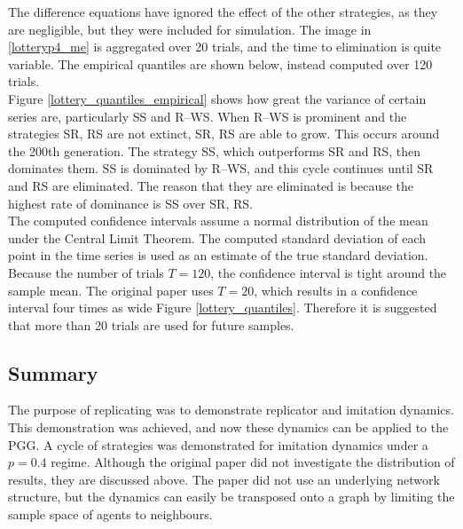 The difference equations have ignored the effect of the other strategies, as they are negligible, but they were included for simulation. The image in \ref{lotteryp4_me} is aggregated over 20 trials, and the time to elimination is quite variable. The empirical quantiles are shown below, instead computed over 120 trials.  \\

\FloatBarrier
{}
\FloatBarrier
Figure \ref{lottery_quantiles_empirical} shows how great the variance of certain series are, particularly SS and R--WS. When R--WS is prominent and the strategies SR, RS are not extinct, SR, RS are able to grow. This occurs around the 200th generation. The strategy SS, which outperforms SR and RS, then dominates them. SS is dominated by R--WS, and this cycle continues until SR and RS are eliminated. The reason that they are eliminated is because the highest rate of dominance is SS over SR, RS. \\
\FloatBarrier
{}
\FloatBarrier
 The computed confidence intervals assume a normal distribution of the mean under the Central Limit Theorem. The computed standard deviation of each point in the time series is used as an estimate of the true standard deviation. Because the number of trials $T=120$, the confidence interval is tight around the sample mean. The original paper uses $T=20$, which results in a confidence interval four times as wide Figure \ref{lottery_quantiles}. Therefore it is suggested that more than 20 trials are used for future samples. \\



\subsection{Summary}
The purpose of replicating \cite{RN30} was to demonstrate replicator and imitation dynamics. This demonstration was achieved, and now these dynamics can be applied to the PGG. A cycle of strategies was demonstrated for imitation dynamics under a $p=0.4$ regime. Although the original paper did not investigate the distribution of results, they are discussed above. The paper \cite{RN30} did not use an underlying network structure, but the dynamics can easily be transposed onto a graph by limiting the sample space of agents to neighbours. \\


